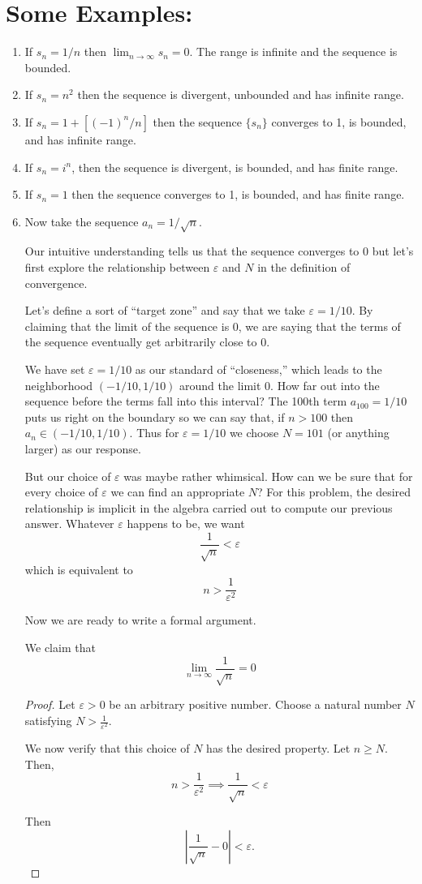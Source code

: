 \section{Some Examples:}\label{sec:sequence-examples}

\begin{enumerate}
	\item If $s_n = 1/n$ then $\lim_{n \to \infty} s_n = 0$.  The range is infinite and the sequence is bounded.
	\item If $s_n = n^2$ then the sequence is divergent, unbounded and has infinite range.
	\item If $s_n = 1 + [{(-1)^n}/n]$ then the sequence $\{s_n\}$ converges to 1, is bounded, and has infinite range.
	\item If $s_n = i^n$, then the sequence is divergent, is bounded, and has finite range.
	\item If $s_n = 1$ then the sequence converges to 1, is bounded, and has finite range.
	\item  Now take the sequence $a_n = 1/\sqrt{n}$.
	
	Our intuitive understanding tells us that the sequence converges to 0 but let's first explore the relationship between $\varepsilon$ and $N$ in the definition of convergence.
	
	Let's define a sort of ``target zone''  and say that we take $\varepsilon = 1/10$.  By claiming that the limit of the sequence is 0, we are saying that the terms of the sequence eventually get arbitrarily close to 0.  
	
	We have set $\varepsilon = 1/10$ as our standard of ``closeness,'' which leads to the neighborhood $(-1/10, 1/10)$ around the limit 0.  How far out into the sequence before the terms fall into this interval?  The 100th term $a_{100} = 1/10$ puts us right on the boundary so we can say that,  if $n>100$ then $a_n \in (-1/10, 1/10)$.  Thus for $\varepsilon = 1/10$ we choose $N=101$ (or anything larger) as our response.
	
	But our choice of $\varepsilon $ was maybe rather whimsical.  How can we be sure that for every choice of $\varepsilon$ we can find an appropriate $N$?  For this problem, the desired relationship is implicit in the algebra carried out to compute our previous answer.  Whatever $\varepsilon $ happens to be, we want 
	\[\frac{1}{\sqrt{n}} < \varepsilon\]
	which is equivalent to 
	\[n > \frac{1}{\varepsilon ^ 2}\]
	
	Now we are ready to write a formal argument.

We claim that \[\lim_{n \to \infty} \frac{1}{\sqrt{n}} = 0\]

\begin{proof}
Let $\varepsilon> 0 $ be an arbitrary positive number.  Choose a natural number $N$ satisfying $N > \frac{1}{\varepsilon ^ 2}$.  

We now verify that this choice of $N$ has the desired property.  Let $n \geq N$.  Then,
\[n > \frac{1}{\varepsilon^2} \implies \frac{1}{\sqrt{n}}< \varepsilon\]

Then \[\left|\frac{1}{\sqrt{n}} - 0\right| < \varepsilon. \]  \end{proof}
\end{enumerate}
